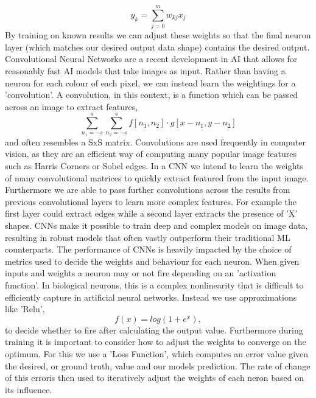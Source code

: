 \documentclass[ %
                    author={Gavin Parker},
                supervisor={Dr. Neill Campbell},
                    degree={MEng},
                     title={Deep Siamese Networks for Illumination Estimation from Stereo Images},
                  subtitle={},
                      type={research},
                      year={2018} ]{dissertation}
\begin{document}
\[y_k = \sum_{j=0}^{m}{w_{kj}x_j}\]
By training on known results we can adjust these weights so that the final neuron layer (which matches our desired output data shape) contains the desired output.
\newline
Convolutional Neural Networks are a recent development in AI that allows for reasonably fast AI models that take images as input. Rather than having a neuron for each colour of each pixel, we can instead learn the weightings for a 'convolution'. A convolution, in this context, is a function which can be passed across an image to extract features,
\[\sum_{n_1=-s}^{s}{\sum_{n_2=-s}^{s}{f[n_1, n_2]\cdot g[x-n_1,y-n_2]}} \]
and often resembles a SxS matrix. Convolutions are used frequently in computer vision, as they are an efficient way of computing many popular image features such as Harris Corners or Sobel edges. In a CNN we intend to learn the weights of many convolutional matrices to quickly extract featured from the input image. Furthermore we are able to pass further convolutions across the results from previous convolutional layers to learn more complex features. For example the first layer could extract edges while a second layer extracts the presence of 'X' shapes. CNNs make it possible to train deep and complex models on image data, resulting in robust models that often vastly outperform their traditional ML counterparts.
\newline
The performance of CNNs is heavily impacted by the choice of metrics used to decide the weights and behaviour for each neuron. When given inputs and weights a neuron may or not fire depending on an 'activation function'. In biological neurons, this is a complex nonlinearity that is difficult to efficiently capture in artificial neural networks. Instead we use approximations like 'Relu',
\[f(x) = log(1 + e^x),\]
to decide whether to fire after calculating the output value. Furthermore during training it is important to consider how to adjust the weights to converge on the optimum. For this we use a 'Loss Function', which computes an error value given the desired, or ground truth, value and our models prediction. The rate of change of this erroris then used to iteratively adjust the weights of each neron based on its influence.
\newline
\end{document}
